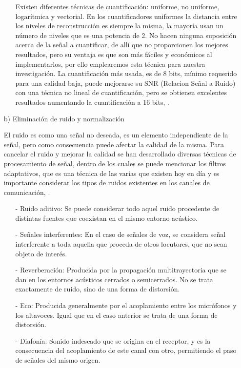 \begin{enumerate}
\begin{enumerate}
Existen diferentes técnicas de cuantificación: uniforme, no uniforme, logarítmica y vectorial. En los cuantificadores uniformes la distancia entre los niveles de reconstrucción es siempre la misma, la mayoría usan un número de niveles que es una potencia de 2. No hacen ninguna suposición acerca de la señal a cuantificar, de allí que no proporcionen los mejores resultados, pero su ventaja es que son más fáciles y económicos al implementarlos, por ello emplearemos esta técnica para nuestra investigación.
\vskip 0.5cm
La cuantificación más usada, es de 8 bits, mínimo requerido para una calidad baja, puede mejorarse su SNR (Relacion Señal a Ruido) con una técnica no lineal de cuantificación, pero se obtienen excelentes resultados aumentando la cuantificación a 16 bits, \cite{kaifu}.
\end{enumerate}

\item[b)]Eliminación de ruido y normalización
\par
El ruido es como una señal no deseada, es un elemento independiente de la señal, pero como consecuencia puede afectar la calidad de la misma. Para cancelar el ruido y mejorar la calidad se han desarrollado diversas técnicas de procesamiento de señal, dentro de los cuales se puede mencionar los filtros adaptativos, que es una técnica de las varias que existen hoy en día y es importante considerar los tipos de ruidos existentes en los canales de comunicación, \cite{henry}.

\begin{enumerate}
\item[-]Ruido aditivo: Se puede considerar todo aquel ruido procedente de distintas fuentes que coexistan en el mismo entorno acústico.
\item[-]Señales interferentes: En el caso de señales de voz, se considera señal interferente a toda aquella que proceda de otros locutores, que no sean objeto de interés.
\item[-]Reverberación: Producida por la propagación multitrayectoria que se dan en los entornos acústicos cerrados o semicerrados. No se trata exactamente de ruido, sino de una forma de distorsión.
\item[-]Eco: Producida generalmente por el acoplamiento entre los micrófonos y los altavoces. Igual que en el caso anterior se trata de una forma de distorsión.
\item[-]Diafonía: Sonido indeseado que se origina en el receptor, y es la consecuencia del acoplamiento de este canal con otro, permitiendo el paso de señales del mismo origen.
\end{enumerate}


\end{enumerate}
